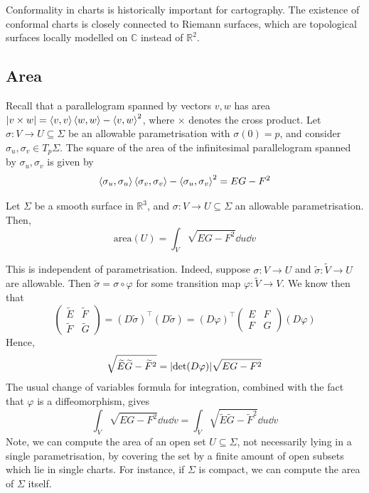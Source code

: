 \documentclass[a4paper,11pt]{article}
\begin{document}
\begin{remark}
	Conformality in charts is historically important for cartography.
	The existence of conformal charts is closely connected to Riemann surfaces, which are topological surfaces locally modelled on \( \mathbb C \) instead of \( \mathbb R^2 \).
\end{remark}

\subsection{Area}
Recall that a parallelogram spanned by vectors \( v, w \) has area \( \abs{v \times w} = \left\langle{v,v}\right\rangle\left\langle{w,w}\right\rangle - \left\langle{v,w}\right\rangle^2 \), where \( \times \) denotes the cross product.
Let \( \sigma \colon V \to U \subseteq \Sigma \) be an allowable parametrisation with \( \sigma(0) = p \), and consider \( \sigma_u, \sigma_v \in T_p \Sigma \).
The square of the area of the infinitesimal parallelogram spanned by \( \sigma_u, \sigma_v \) is given by
\[
	\left\langle{\sigma_u, \sigma_u}\right\rangle\left\langle{\sigma_v, \sigma_v}\right\rangle - \left\langle{\sigma_u, \sigma_v}\right\rangle^2 = EG - F^2
\]
\begin{definition}
	Let \( \Sigma \) be a smooth surface in \( \mathbb R^3 \), and \( \sigma \colon V \to U \subseteq \Sigma \) an allowable parametrisation.
	Then,
	\[
		\mathrm{area}(U) = \int_V \sqrt{EG - F^2} \dd{u}\dd{v}
	\]
\end{definition}
\begin{note}
	This is independent of parametrisation.
	Indeed, suppose \( \sigma \colon V \to U \) and \( \widetilde \sigma \colon \widetilde V \to U \) are allowable.
	Then \( \widetilde \sigma = \sigma \circ \varphi \) for some transition map \( \varphi \colon \widetilde V \to V \).
	We know then that
	\[
		\begin{pmatrix}
			\widetilde E & \widetilde F \\
			\widetilde F & \widetilde G
		\end{pmatrix} = (D\widetilde \sigma)^\top (D\widetilde \sigma) = (D\varphi)^\top \begin{pmatrix}
			E & F \\
			F & G
		\end{pmatrix} (D\varphi)
	\]
	Hence,
	\[
		\sqrt{\widetilde E \widetilde G - \widetilde F^2} = \abs{\det(D\varphi)} \sqrt{EG - F^2}
	\]
	The usual change of variables formula for integration, combined with the fact that \( \varphi \) is a diffeomorphism, gives
	\[
		\int_V \sqrt{EG - F^2} \dd{u}\dd{v} = \int_{\widetilde V} \sqrt{\widetilde E \widetilde G - \widetilde F^2} \dd{u}\dd{v}
	\]
	Note, we can compute the area of an open set \( U \subseteq \Sigma \), not necessarily lying in a single parametrisation, by covering the set by a finite amount of open subsets which lie in single charts.
	For instance, if \( \Sigma \) is compact, we can compute the area of \( \Sigma \) itself.
\end{note}
\end{document}
